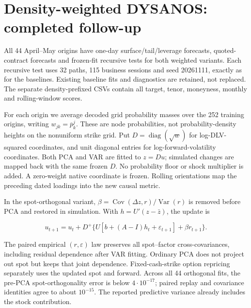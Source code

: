 \documentclass[11pt]{article}
\begin{document}
\section{Density-weighted DYSANOS: completed follow-up}

All 44 April--May origins have one-day surface/tail/leverage forecasts, quoted-contract forecasts and frozen-fit recursive tests for both weighted variants. Each recursive test uses 32 paths, 115 business sessions and seed 20261111, exactly as for the baselines. Existing baseline fits and diagnostics are retained, not replaced. The separate density-prefixed CSVs contain all target, tenor, moneyness, monthly and rolling-window scores.

For each origin we average decoded grid probability masses over the 252 training origins, writing $w_{jk}=\overline p^j_k$. These are node probabilities, not probability-density heights on the nonuniform strike grid. Put $D=\operatorname{diag}(\sqrt w)$ for log-DLV-squared coordinates, and unit diagonal entries for log-forward-volatility coordinates. Both PCA and VAR are fitted to $z=Du$; simulated changes are mapped back with the same frozen $D$. No probability floor or shock multiplier is added. A zero-weight native coordinate is frozen. Rolling orientations map the preceding dated loadings into the new causal metric.

In the spot-orthogonal variant, $\beta=\operatorname{Cov}(\Delta z,r)/\operatorname{Var}(r)$ is removed before PCA and restored in simulation. With $h=U'(z-\bar z)$, the update is

\[u_{t+1}=u_t+D^+\{U[b+(A-I)h_t+\varepsilon_{t+1}]+\beta r_{t+1}\}.\]

The paired empirical $(r,\varepsilon)$ law preserves all spot--factor cross-covariances, including residual dependence after VAR fitting. Ordinary PCA does not project out spot but keeps that joint dependence. Fixed-cash-strike option repricing separately uses the updated spot and forward. Across all 44 orthogonal fits, the pre-PCA spot-orthogonality error is below $4\cdot10^{-17}$; paired replay and covariance identities agree to about $10^{-15}$. The reported predictive variance already includes the stock contribution.
\end{document}

